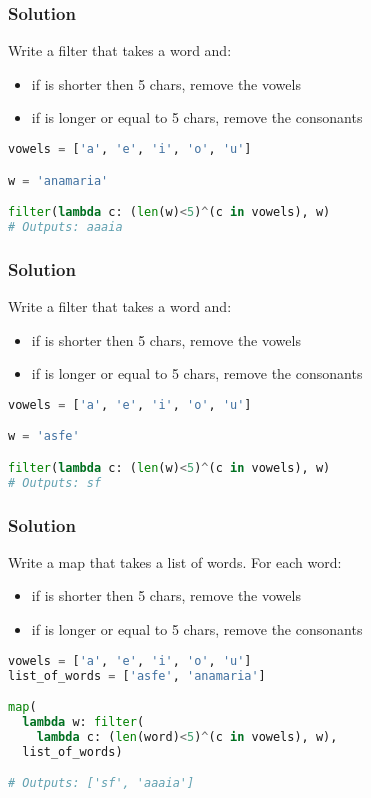 \documentclass{beamer}
\begin{document}
\begin{frame}[fragile]
\frametitle{Solution}
Write a filter that takes a word and:\
\begin{itemize}
   \item if is shorter then 5 chars, remove the vowels
   \item if is longer or equal to 5 chars, remove the consonants
\end{itemize}

\begin{lstlisting}[language=python]
vowels = ['a', 'e', 'i', 'o', 'u']

w = 'anamaria'

filter(lambda c: (len(w)<5)^(c in vowels), w)
# Outputs: aaaia

\end{lstlisting}
\end{frame}

\begin{frame}[fragile]
\frametitle{Solution}
Write a filter that takes a word and:\
\begin{itemize}
   \item if is shorter then 5 chars, remove the vowels
   \item if is longer or equal to 5 chars, remove the consonants
\end{itemize}

\begin{lstlisting}[language=python]
vowels = ['a', 'e', 'i', 'o', 'u']

w = 'asfe'

filter(lambda c: (len(w)<5)^(c in vowels), w)
# Outputs: sf

\end{lstlisting}
\end{frame}

\begin{frame}[fragile]
\frametitle{Solution}
Write a map that takes a list of words. For each word:
\begin{itemize}
   \item if is shorter then 5 chars, remove the vowels
   \item if is longer or equal to 5 chars, remove the consonants
\end{itemize}
\begin{lstlisting}[language=python]
vowels = ['a', 'e', 'i', 'o', 'u']
list_of_words = ['asfe', 'anamaria']

map(
  lambda w: filter(
    lambda c: (len(word)<5)^(c in vowels), w),
  list_of_words)

# Outputs: ['sf', 'aaaia']
\end{lstlisting}
\end{frame}
\end{document}
